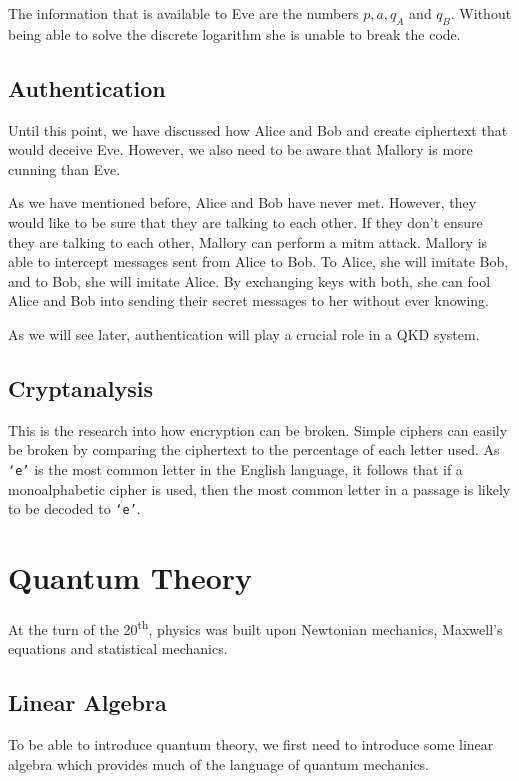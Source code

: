 The information that is available to Eve are the numbers $p, a, q_{A}$ and $q_{B}$. Without being able to solve the discrete logarithm she is unable to break the code. 

\subsection{Authentication}

Until this point, we have discussed how Alice and Bob and create ciphertext that would deceive Eve. However, we also need to be aware that Mallory is more cunning than Eve. 

As we have mentioned before, Alice and Bob have never met. However, they would like to be sure that they are talking to each other. If they don't ensure they are talking to each other, Mallory can perform a \ac{mitm} attack. Mallory is able to intercept messages sent from Alice to Bob. To Alice, she will imitate Bob, and to Bob, she will imitate Alice. By exchanging keys with both, she can fool Alice and Bob into sending their secret messages to her without ever knowing.

As we will see later, authentication will play a crucial role in a \ac{QKD} system.

\subsection{Cryptanalysis}
\label{sec1:cryptanalysis}

This is the research into how encryption can be broken. Simple ciphers can easily be broken by comparing the ciphertext to the percentage of each letter used. As {\tt `e'} is the most common letter in the English language, it follows that if a monoalphabetic cipher is used, then the most common letter in a passage is likely to be decoded to {\tt `e'}.

\section{Quantum Theory}

At the turn of the 20\textsuperscript{th}, physics was built upon Newtonian mechanics, Maxwell's equations and statistical mechanics. 

\subsection{Linear Algebra}

To be able to introduce quantum theory, we first need to introduce some linear algebra which provides much of the language of quantum mechanics.

